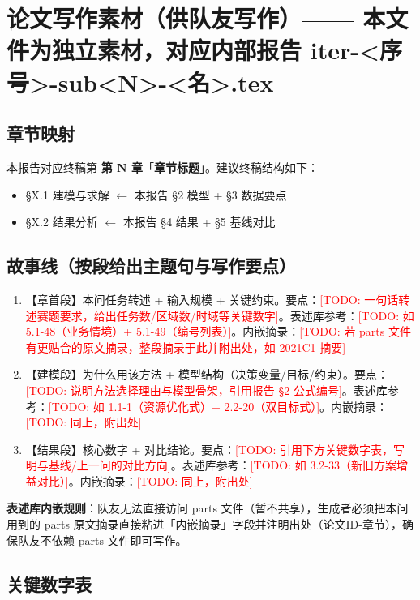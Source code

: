 \documentclass{article}   %
\newcommand{\todo}[1]{\textcolor{red}{[TODO: #1]}}
\begin{document}
\section{论文写作素材（供队友写作）—— 本文件为独立素材，对应内部报告 iter-<序号>-sub<N>-<名>.tex}

\subsection{章节映射}

本报告对应终稿第 \textbf{第 N 章}「\textbf{章节标题}」。建议终稿结构如下：
\begin{itemize}
  \item §X.1 建模与求解 \quad $\leftarrow$ 本报告 §2 模型 + §3 数据要点
  \item §X.2 结果分析 \quad $\leftarrow$ 本报告 §4 结果 + §5 基线对比
\end{itemize}

\subsection{故事线（按段给出主题句与写作要点）}

\begin{enumerate}
  \item 【章首段】本问任务转述 + 输入规模 + 关键约束。要点：\todo{一句话转述赛题要求，给出任务数/区域数/时域等关键数字}。表述库参考：\todo{如 5.1-48（业务情境）+ 5.1-49（编号列表）}。内嵌摘录：\todo{若 parts 文件有更贴合的原文摘录，整段摘录于此并附出处，如 2021C1-摘要}
  \item 【建模段】为什么用该方法 + 模型结构（决策变量/目标/约束）。要点：\todo{说明方法选择理由与模型骨架，引用报告 §2 公式编号}。表述库参考：\todo{如 1.1-1（资源优化式）+ 2.2-20（双目标式）}。内嵌摘录：\todo{同上，附出处}
  \item 【结果段】核心数字 + 对比结论。要点：\todo{引用下方关键数字表，写明与基线/上一问的对比方向}。表述库参考：\todo{如 3.2-33（新旧方案增益对比）}。内嵌摘录：\todo{同上，附出处}
\end{enumerate}

\textbf{表述库内嵌规则}：队友无法直接访问 parts 文件（暂不共享），生成者必须把本问用到的 parts 原文摘录直接粘进「内嵌摘录」字段并注明出处（论文ID-章节），确保队友不依赖 parts 文件即可写作。

\subsection{关键数字表}
\end{document}
